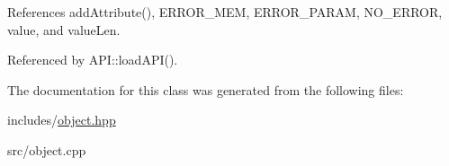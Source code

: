 References add\+Attribute(), E\+R\+R\+O\+R\+\_\+\+M\+E\+M, E\+R\+R\+O\+R\+\_\+\+P\+A\+R\+A\+M, N\+O\+\_\+\+E\+R\+R\+O\+R, value, and value\+Len.



Referenced by A\+P\+I\+::load\+A\+P\+I().



The documentation for this class was generated from the following files\+:\begin{DoxyCompactItemize}
\item 
includes/\hyperlink{object_8hpp}{object.\+hpp}\item 
src/object.\+cpp\end{DoxyCompactItemize}
